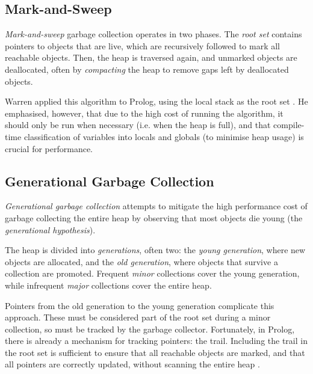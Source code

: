 \subsection{Mark-and-Sweep}

\label{sec:prep-mark-and-sweep}

\emph{Mark-and-sweep} garbage collection operates in two phases. The \emph{root set} contains pointers to objects that are live, which are recursively followed to mark all reachable objects. Then, the heap is traversed again, and unmarked objects are deallocated, often by \emph{compacting} the heap to remove gaps left by deallocated objects.

Warren applied this algorithm to Prolog, using the local stack as the root set \cite{warrenImplementingPrologCompiling1977}. He emphasised, however, that due to the high cost of running the algorithm, it should only be run when necessary (i.e. when the heap is full), and that compile-time classification of variables into locals and globals (to minimise heap usage) is crucial for performance.

\subsection{Generational Garbage Collection}

\label{sec:generational-gc}

\emph{Generational garbage collection} attempts to mitigate the high performance cost of garbage collecting the entire heap by observing that most objects die young (the \emph{generational hypothesis}).

The heap is divided into \emph{generations}, often two: the \emph{young generation}, where new objects are allocated, and the \emph{old generation}, where objects that survive a collection are promoted. Frequent \emph{minor} collections cover the young generation, while infrequent \emph{major} collections cover the entire heap.

Pointers from the old generation to the young generation complicate this approach. These must be considered part of the root set during a minor collection, so must be tracked by the garbage collector. Fortunately, in Prolog, there is already a mechanism for tracking pointers: the trail. Including the trail in the root set is sufficient to ensure that all reachable objects are marked, and that all pointers are correctly updated, without scanning the entire heap \cite{bekkersDynamicMemoryManagement1992}.


